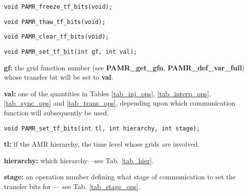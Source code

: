 \documentclass[aps,amssymb,unsortedaddress,nofootinbib]{revtex4}
\def\lsep{\itemsep 0.05in}
\begin{document}

\begin{verbatim}
void PAMR_freeze_tf_bits(void);
\end{verbatim}


\begin{verbatim}
void PAMR_thaw_tf_bits(void);
\end{verbatim}


\begin{verbatim}
void PAMR_clear_tf_bits(void);
\end{verbatim}


\begin{verbatim}
void PAMR_set_tf_bit(int gf, int val);
\end{verbatim}
\begin{list}{}{\lsep}
\item {\bf gf:} the grid function number (see {\bf PAMR\_get\_gfn}, {\bf PAMR\_def\_var\_full}) 
                whose transfer bit will be set to {\bf val}.
\item {\bf val:} one of the quantities in Tables \ref{tab_inj_ops}, \ref{tab_interp_ops}, 
                 \ref{tab_sync_ops} and \ref{tab_trans_ops}, depending upon which communication
                 function will subsequently be used.
\end{list}


\begin{verbatim}
void PAMR_set_tf_bits(int tl, int hierarchy, int stage);
\end{verbatim}
\begin{list}{}{\lsep}
\item {\bf tl:} if the AMR hierarchy, the time level whose grids are involved.
\item {\bf hierarchy:} which hierarchy---see Tab. \ref{tab_hier}.
\item {\bf stage:} an operation number defining what stage of communication
                   to set the transfer bits for --- see Tab. \ref{tab_stage_ops}.
\end{list}
\end{document}

